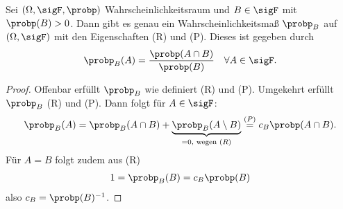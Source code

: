 \begin{lemma}
	Sei $(\Omega, \sigF, \probp)$ Wahrscheinlichkeitsraum und $B \in \sigF$ mit $\probp(B) > 0$. Dann gibt es genau ein Wahrscheinlichkeitsmaß $\probp_B$ auf $(\Omega, \sigF)$ mit den Eigenschaften (R) und (P). Dieses ist gegeben durch
	\begin{align}
		\probp_{B}(A) = \frac{\probp(A\cap B)}{\probp(B)} \quad \forall A \in \sigF.\notag
	\end{align}
\end{lemma}

\begin{proof}
	Offenbar erfüllt $\probp_{B}$ wie definiert (R) und (P). Umgekehrt erfüllt $\probp_{B}$ (R) und (P). Dann folgt für $A \in \sigF$:
	\begin{align}
		\probp_{B}(A) = \probp_{B}(A\cap B) + \underbrace{\probp_{B}(A\setminus B)}_{= 0, \text{ wegen } (R)} \overset{(P)}{=} c_B \probp(A \cap B).\notag
	\end{align}
	Für $A=B$ folgt zudem aus (R)
	\begin{align}
		1 = \probp_{B}(B) = c_B \probp(B)\notag
	\end{align}
	also $c_B = \probp(B)^{-1}$.
\end{proof}